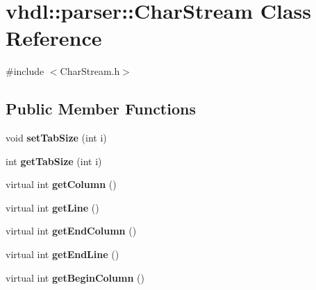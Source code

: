 \hypertarget{classvhdl_1_1parser_1_1_char_stream}{}\section{vhdl\+::parser\+::Char\+Stream Class Reference}
\label{classvhdl_1_1parser_1_1_char_stream}


{\ttfamily \#include $<$Char\+Stream.\+h$>$}

\subsection*{Public Member Functions}
\begin{DoxyCompactItemize}
\item 
\mbox{\label{classvhdl_1_1parser_1_1_char_stream_a3b9ca593901a797f6076230835b64b08}} 
void {\bfseries set\+Tab\+Size} (int i)
\item 
\mbox{\label{classvhdl_1_1parser_1_1_char_stream_ad61bba1ec964d0ca48f36f71c7c465e3}} 
int {\bfseries get\+Tab\+Size} (int i)
\item 
\mbox{\label{classvhdl_1_1parser_1_1_char_stream_aba9c006a8d5510d8054df8dc83c4f063}} 
virtual int {\bfseries get\+Column} ()
\item 
\mbox{\label{classvhdl_1_1parser_1_1_char_stream_a35f578cd3509a81008518b7effdefda1}} 
virtual int {\bfseries get\+Line} ()
\item 
\mbox{\label{classvhdl_1_1parser_1_1_char_stream_a02054db796d1066becc894c70f429a3d}} 
virtual int {\bfseries get\+End\+Column} ()
\item 
\mbox{\label{classvhdl_1_1parser_1_1_char_stream_abac99aec0fdf89f82387c205f5e55e5a}} 
virtual int {\bfseries get\+End\+Line} ()
\item 
\mbox{\label{classvhdl_1_1parser_1_1_char_stream_a3e0f2c3e5fa9250abf00696661639488}} 
virtual int {\bfseries get\+Begin\+Column} ()
\item 

\end{DoxyCompactItemize}
